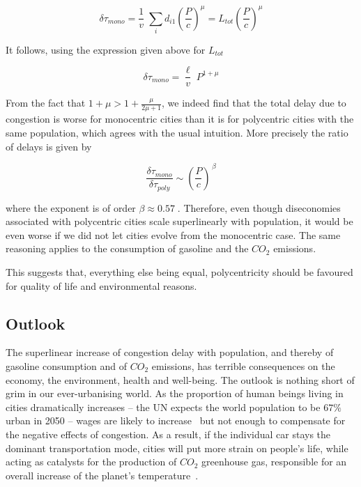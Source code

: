 \begin{equation}
    \delta \tau_{mono} = \frac{1}{v}\; \sum_i d_{i1} \left(\frac{P}{c} \right)^\mu = L_{tot} \left(\frac{P}{c} \right)^\mu
\end{equation}

It follows, using the expression given above for $L_{tot}$

\begin{equation}
    \delta\tau_{mono} = \frac{\ell}{v}\; P^{1+\mu}
\end{equation}

From the fact that $1+\mu > 1+\frac{\mu}{2\mu+1}$, we indeed find that the total
delay due to congestion is worse for monocentric cities than it is for
polycentric cities with the same population, which agrees with the usual
intuition. More precisely the ratio of delays is given by

\begin{equation}
    \frac{\delta\tau_{mono}}{\delta\tau_{poly}}\sim
    \left(\frac{P}{c}\right)^{\,\beta}
\end{equation}

where the exponent is of order $\beta \approx 0.57\;$. Therefore, even though
diseconomies associated with polycentric cities scale superlinearly with
population, it would be even worse if we did not let cities evolve from the
monocentric case. The same reasoning applies to the consumption of gasoline and
the $CO_2$ emissions. 

This suggests that, everything else being equal,
polycentricity should be favoured for quality of life and environmental reasons.


\subsection{Outlook}

The superlinear increase of congestion delay with population, and thereby of
gasoline consumption and of $CO_2$ emissions, has terrible consequences on the
economy, the environment, health and well-being. The outlook is nothing short of
grim in our ever-urbanising world. As the proportion of human beings living in
cities dramatically increases -- the UN expects the world population to be $67\%$
urban in 2050 -- wages are likely to 
increase~\cite{Bettencourt:2007} but not enough to compensate for the negative
effects of congestion. As a result, if the individual car stays the dominant
transportation mode, cities will put more strain on people's life, while acting
as catalysts for the production of $CO_2$ greenhouse gas, responsible for an
overall increase of the planet's temperature~\cite{Oreskes:2004}. 


